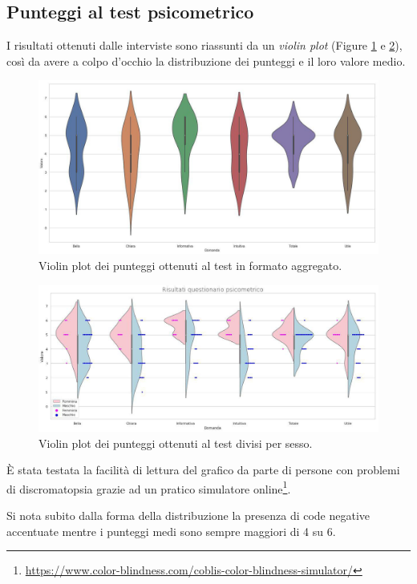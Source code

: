 \documentclass[12pt, a4paper, twocolumn]{article} %
\begin{document}
\subsection{Punteggi al test psicometrico}
I risultati ottenuti dalle interviste sono riassunti da un \textit{violin plot} (Figure \ref{plot:violin} e \ref{plot:violin_fm}), così da avere a colpo d'occhio la distribuzione dei punteggi e il loro valore medio.
\begin{figure}[p]
  \includegraphics[width=\textwidth]{violin_plot.jpg}
  \caption{Violin plot dei punteggi ottenuti al test in formato aggregato.}
  \label{plot:violin}
\end{figure}
\begin{figure}[p]
  \includegraphics[width=\textwidth]{violin_plot_fm.jpg}
  \caption{Violin plot dei punteggi ottenuti al test divisi per sesso.}
  \label{plot:violin_fm}
\end{figure}
È stata testata la facilità di lettura del grafico da parte di persone con problemi di discromatopsia grazie ad un pratico simulatore online\footnote{\url{https://www.color-blindness.com/coblis-color-blindness-simulator/}}.

Si nota subito dalla forma della distribuzione la presenza di code negative accentuate mentre i punteggi medi sono sempre maggiori di 4 su 6.
\end{document}
